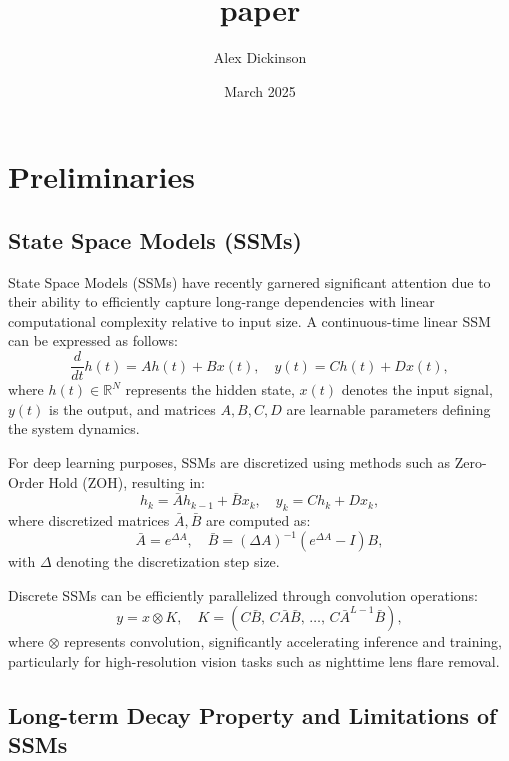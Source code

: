 \documentclass{article}
\title{paper}
\author{Alex Dickinson}
\date{March 2025}
\begin{document}
\maketitle

\section{Preliminaries}

\subsection{State Space Models (SSMs)}

State Space Models (SSMs) have recently garnered significant attention due to their ability to efficiently capture long-range dependencies with linear computational complexity relative to input size. A continuous-time linear SSM can be expressed as follows:
\begin{equation}
\frac{d}{dt}h(t)=Ah(t)+Bx(t), \quad y(t)=Ch(t)+Dx(t),
\end{equation}
where \(h(t)\in\mathbb{R}^{N}\) represents the hidden state, \(x(t)\) denotes the input signal, \(y(t)\) is the output, and matrices \(A,B,C,D\) are learnable parameters defining the system dynamics.

For deep learning purposes, SSMs are discretized using methods such as Zero-Order Hold (ZOH), resulting in:
\begin{equation}
h_k=\bar{A}h_{k-1}+\bar{B}x_k,\quad y_k=Ch_k+Dx_k,
\end{equation}
where discretized matrices \(\bar{A},\bar{B}\) are computed as:
\begin{equation}
\bar{A}=e^{\Delta A},\quad\bar{B}=(\Delta A)^{-1}(e^{\Delta A}-I)B,
\end{equation}
with \(\Delta\) denoting the discretization step size.

Discrete SSMs can be efficiently parallelized through convolution operations:
\begin{equation}
y = x\otimes K,\quad K=(C\bar{B},\,C\bar{A}\bar{B},\,\dots,\,C\bar{A}^{L-1}\bar{B}),
\end{equation}
where \(\otimes\) represents convolution, significantly accelerating inference and training, particularly for high-resolution vision tasks such as nighttime lens flare removal.

\subsection{Long-term Decay Property and Limitations of SSMs}
\end{document}
